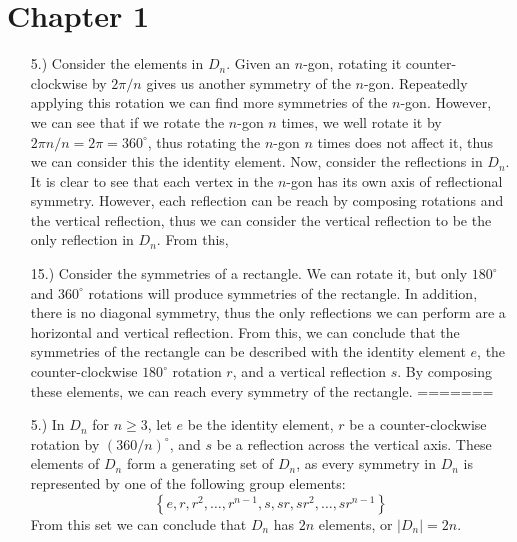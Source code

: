 \documentclass[12pt]{article}
\newcommand{\vertb}[1]{\left\vert#1\right\vert}      %
\newcommand{\braces}[1]{\left\{#1\right\}}           %
\begin{document}
\pagestyle{fancy}
\fancyhead{}

\normalsize

\section*{Chapter 1}
\begin{itemize}
<<<<<<< HEAD
    \item [5.)] Consider the elements in $D_n$. Given an $n$-gon, rotating it counter-clockwise by $2\pi/n$ gives us another symmetry of the $n$-gon. Repeatedly applying this rotation we can find more symmetries of the $n$-gon. However, we can see that if we rotate the $n$-gon $n$ times, we well rotate it by $2\pi n/n=2\pi=360^\circ$, thus rotating the $n$-gon $n$ times does not affect it, thus we can consider this the identity element. Now, consider the reflections in $D_n$. It is clear to see that each vertex in the $n$-gon has its own axis of reflectional symmetry. However, each reflection can be reach by composing rotations and the vertical reflection, thus we can consider the vertical reflection to be the only reflection in $D_n$. From this, 

    \item [15.)] Consider the symmetries of a rectangle. We can rotate it, but only $180^\circ$ and $360^\circ$ rotations will produce symmetries of the rectangle. In addition, there is no diagonal symmetry, thus the only reflections we can perform are a horizontal and vertical reflection. From this, we can conclude that the symmetries of the rectangle can be described with the identity element $e$, the counter-clockwise $180^\circ$ rotation $r$, and a vertical reflection $s$. By composing these elements, we can reach every symmetry of the rectangle.
=======
    \item [5.)] In $D_n$ for $n\ge3$, let $e$ be the identity element, $r$ be a counter-clockwise rotation by $(360/n)^\circ$, and $s$ be a reflection across the vertical axis. These elements of $D_n$ form a generating set of $D_n$, as every symmetry in $D_n$ is represented by one of the following group elements:
    \[\braces{e,r,r^2,\dots,r^{n-1},s,sr,sr^2,\dots,sr^{n-1}}\]
    From this set we can conclude that $D_n$ has $2n$ elements, or $\vertb{D_n}=2n$.


\end{itemize}
\end{document}
